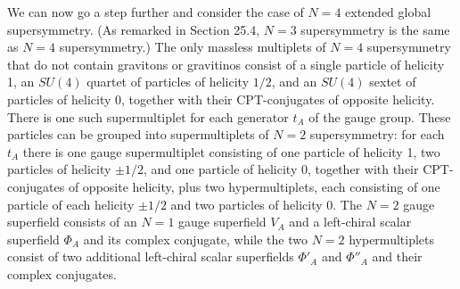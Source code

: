 We can now go a step further and consider the case of \(N=4\) extended global
supersymmetry. (As remarked in Section 25.4, \(N=3\) supersymmetry is the same
as \(N=4\) supersymmetry.) The only massless multiplets of \(N=4\)
supersymmetry that do not contain gravitons or gravitinos consist of a single
particle of helicity 1, an \(SU(4)\) quartet of particles of helicity \(1/2\),
and an \(SU(4)\) sextet of particles of helicity 0, together with their
CPT-conjugates of opposite helicity. There is one such supermultiplet for
each generator \(t_A\) of the gauge group. These particles can be grouped
into supermultiplets of \(N=2\) supersymmetry: for each \(t_A\) there is one
gauge supermultiplet consisting of one particle of helicity 1, two particles
of helicity \(\mathord{\pm}1/2\), and one particle of helicity 0, together
with their CPT-conjugates of opposite helicity, plus two hypermultiplets,
each consisting of one particle of each helicity \(\mathord{\pm}1/2\) and
two particles of helicity 0. The \(N=2\) gauge superfield consists of an
\(N=1\) gauge superfield \(V_A\) and a left-chiral scalar superfield
\(\Phi_A\) and its complex conjugate, while the two \(N=2\) hypermultiplets
consist of two additional left-chiral scalar superfields \(\Phi'_A\) and
\(\Phi''_A\) and their complex conjugates.


